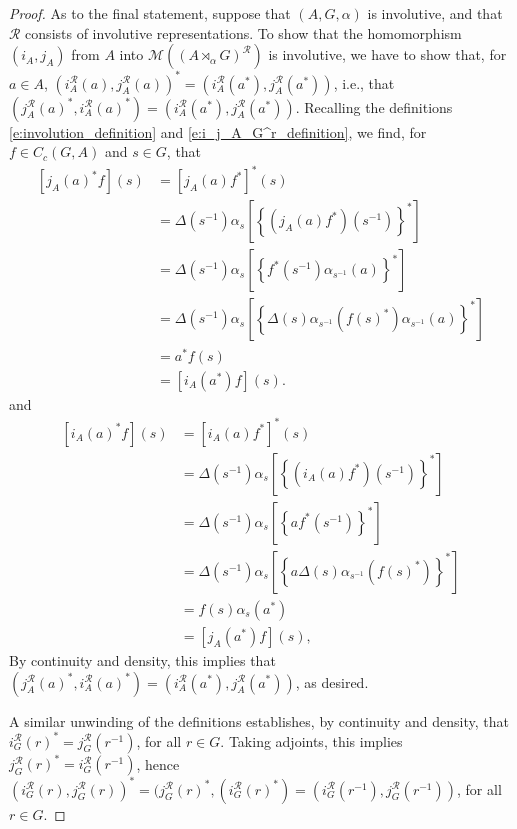 \documentclass{amsart}
\theoremstyle{plain}
\theoremstyle{definition}
\numberwithin{equation}{section}
\begin{document}
\begin{proof}
As to the final statement, suppose that ${(A,G,\alpha)}$ is involutive, and that $\mathcal{R}$ consists of involutive representations. To show that the homomorphism $(i_A, j_A)$ from $A$ into $\mathcal M({(A {\rtimes}_\alpha G)^\mathcal{R}})$ is involutive, we have to show that, for $a\in A$, $(i_A^{\mathcal R}(a),j_A^{\mathcal R}(a))^* = (i_A^{\mathcal R}(a^*), j_A^{\mathcal R}(a^*))$, i.e., that  $(j_A^{\mathcal R}(a)^*,i_A^{\mathcal R}(a)^*)=(i_A^{\mathcal R}(a^*), j_A^{\mathcal R}(a^*))$. Recalling the definitions \eqref{e:involution_definition} and \eqref{e:i_j_A_G^r_definition}, we find, for $f\in C_c(G,A)$ and $s\in G$, that
\begin{align*}
\left[ j_A(a)^* f\right](s) &= \left[j_A(a)f^*\right]^*(s) \\
&= \Delta(s^{-1}) \alpha_s\left[\left\{(j_A(a)f^*)(s^{-1})\right\}^*\right]\\
&= \Delta(s^{-1}) \alpha_s\left[\left\{f^*(s^{-1})\alpha_{s^{-1}}(a)\right\}^*\right]\\
&= \Delta(s^{-1}) \alpha_s\left[\left\{\Delta(s)\alpha_{s^{-1}}(f(s)^*)\alpha_{s^{-1}}(a)\right\}^*\right] \\
&= a^* f(s)\\
&= [i_A(a^*)f](s).
\end{align*}
and
\begin{align*}
\left[i_A(a)^* f\right](s) &= \left[i_A(a)f^*\right]^*(s)\\
&=\Delta(s^{-1})\alpha_s\left[\left\{(i_A(a)f^*)(s^{-1})\right\}^*\right]\\
&=\Delta(s^{-1})\alpha_s\left[\left\{af^*(s^{-1})\right\}^*\right]\\
&=\Delta(s^{-1})\alpha_s\left[\left\{a\Delta(s)\alpha_{s^{-1}}(f(s)^*)\right\}^*\right]\\
&=f(s)\alpha_s(a^*)\\
&=\left[j_A(a^*)f\right](s),
\end{align*}
By continuity and density, this implies that $(j_A^{\mathcal R}(a)^*,i_A^{\mathcal R}(a)^*)=(i_A^{\mathcal R}(a^*), j_A^{\mathcal R}(a^*))$, as desired.

A similar unwinding of the definitions establishes, by continuity and density, that $i_G^{\mathcal R}(r)^* = j_G^{\mathcal R}(r^{-1})$, for all $r\in G$. Taking adjoints, this implies $j_G^{\mathcal R}(r)^*=i_G^{\mathcal R}(r^{-1})$, hence $(i_G^{\mathcal R}(r), j_G^{\mathcal R}(r))^*=(j_G^{\mathcal R}(r)^*, (i_G^{\mathcal R}(r)^*)=(i_G^{\mathcal R}(r^{-1}), j_G^{\mathcal R}(r^{-1}))$, for all $r\in G$.
\end{proof}
\end{document}

